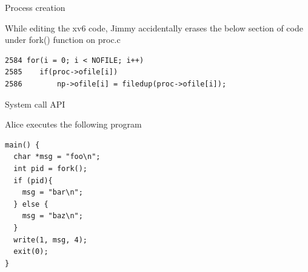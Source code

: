 \documentclass[11pt]{exam}
\begin{document}
\begin{questions}


\newpage
\addpoints
\question Process creation


While editing the xv6 code, Jimmy accidentally erases the below section of
code under fork() function on proc.c
\begin{verbatim}
2584 for(i = 0; i < NOFILE; i++)
2585    if(proc->ofile[i])
2586        np->ofile[i] = filedup(proc->ofile[i]);
\end{verbatim}


\newpage
\addpoints
\question System call API

Alice 
%
%
executes the following program
\begin{verbatim}
main() {
  char *msg = "foo\n";
  int pid = fork();
  if (pid){
    msg = "bar\n";
  } else {
    msg = "baz\n";
  }
  write(1, msg, 4);
  exit(0);
}
\end{verbatim}


\end{questions}
\end{document}

